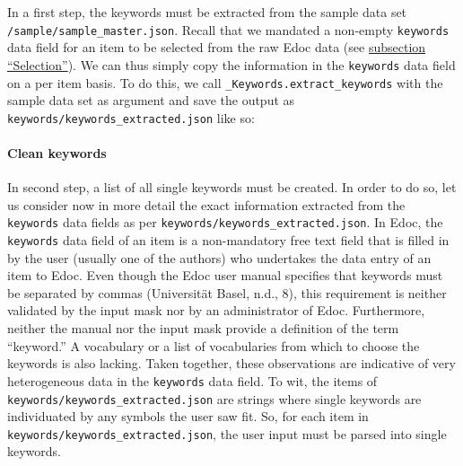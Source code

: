 In a first step, the keywords must be extracted from the sample data set
\texttt{/sample/sample\_master.json}. Recall that we mandated a
non-empty \texttt{keywords} data field for an item to be selected from
the raw Edoc data (see \protect\hyperlink{selection}{subsection
``Selection''}). We can thus simply copy the information in the
\texttt{keywords} data field on a per item basis. To do this, we call
\texttt{\_Keywords.extract\_keywords} with the sample data set as
argument and save the output as
\texttt{keywords/keywords\_extracted.json} like so:

\begin{Shaded}
\begin{Highlighting}[]
\OperatorTok{=}\OperatorTok{+} \NormalTok{)}
\OperatorTok{+} \NormalTok{)}
\end{Highlighting}
\end{Shaded}

\hypertarget{clean-keywords}{%
\paragraph{Clean keywords}\label{clean-keywords}}

In second step, a list of all single keywords must be created. In order
to do so, let us consider now in more detail the exact information
extracted from the \texttt{keywords} data fields as per
\texttt{keywords/keywords\_extracted.json}. In Edoc, the
\texttt{keywords} data field of an item is a non-mandatory free text
field that is filled in by the user (usually one of the authors) who
undertakes the data entry of an item to Edoc. Even though the Edoc user
manual specifies that keywords must be separated by commas (Universität
Basel, n.d., 8), this requirement is neither validated by the input mask
nor by an administrator of Edoc. Furthermore, neither the manual nor the
input mask provide a definition of the term ``keyword.'' A vocabulary or
a list of vocabularies from which to choose the keywords is also
lacking. Taken together, these observations are indicative of very
heterogeneous data in the \texttt{keywords} data field. To wit, the
items of \texttt{keywords/keywords\_extracted.json} are strings where
single keywords are individuated by any symbols the user saw fit. So,
for each item in \texttt{keywords/keywords\_extracted.json}, the user
input must be parsed into single keywords.

